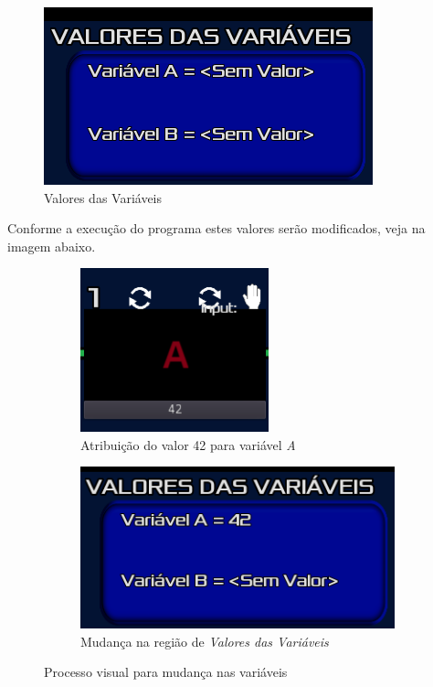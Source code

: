 \begin{figure}[H]
    \includegraphics[scale=0.8]{../figuras/valores_variaveis.png}
    \caption{Valores das Variáveis}
\end{figure}

Conforme a execução do programa estes valores serão modificados, veja na 
imagem abaixo.

\begin{figure}[H]
    \centering
    \begin{subfigure}{0.48\textwidth}
        \centering
        \includegraphics[width=0.6\textwidth]{../figuras/atribuicao_variavel.png}
        \caption{Atribuição do valor 42 para variável \textit{A}}
    \end{subfigure}
    \begin{subfigure}{0.48\textwidth}
        \centering
        \includegraphics[width=1\textwidth]{../figuras/modific_tabela_variavel.png}
        \caption{Mudança na região de \textit{Valores das Variáveis}}
    \end{subfigure}  
    \caption{Processo visual para mudança nas variáveis}
\end{figure}

